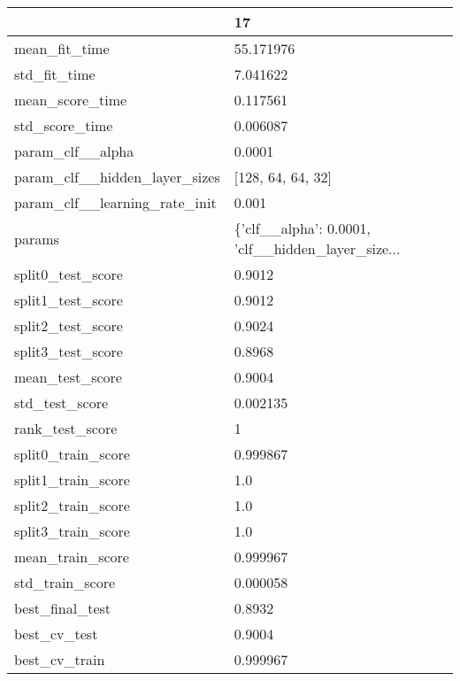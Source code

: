 \begin{tabular}{ll}
\toprule
{} &                                                 17 \\
\midrule
mean\_fit\_time                 &                                          55.171976 \\
std\_fit\_time                  &                                           7.041622 \\
mean\_score\_time               &                                           0.117561 \\
std\_score\_time                &                                           0.006087 \\
param\_clf\_\_alpha              &                                             0.0001 \\
param\_clf\_\_hidden\_layer\_sizes &                                  [128, 64, 64, 32] \\
param\_clf\_\_learning\_rate\_init &                                              0.001 \\
params                        &  \{'clf\_\_alpha': 0.0001, 'clf\_\_hidden\_layer\_size... \\
split0\_test\_score             &                                             0.9012 \\
split1\_test\_score             &                                             0.9012 \\
split2\_test\_score             &                                             0.9024 \\
split3\_test\_score             &                                             0.8968 \\
mean\_test\_score               &                                             0.9004 \\
std\_test\_score                &                                           0.002135 \\
rank\_test\_score               &                                                  1 \\
split0\_train\_score            &                                           0.999867 \\
split1\_train\_score            &                                                1.0 \\
split2\_train\_score            &                                                1.0 \\
split3\_train\_score            &                                                1.0 \\
mean\_train\_score              &                                           0.999967 \\
std\_train\_score               &                                           0.000058 \\
best\_final\_test               &                                             0.8932 \\
best\_cv\_test                  &                                             0.9004 \\
best\_cv\_train                 &                                           0.999967 \\
\bottomrule
\end{tabular}
